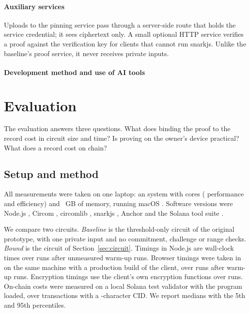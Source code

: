 \paragraph{Auxiliary services} Uploads to the pinning service pass through
a server-side route that holds the service credential; it sees ciphertext
only. A small optional HTTP service verifies a proof against the
verification key for clients that cannot run snarkjs. Unlike the baseline's
proof service, it never receives private inputs.

\ifspringerbuild
\paragraph{Development method and use of AI tools} \aistatement
\fi

\section{Evaluation}\label{sec:eval}

The evaluation answers three questions. What does binding the proof to the
record cost in circuit size and time? Is proving on the owner's device
practical? What does a record cost on chain?

\subsection{Setup and method}

All measurements were taken on one laptop: an \EnvCpu{} system with
\EnvCores{} cores (\EnvPerfCores{} performance and \EnvEffCores{}
efficiency) and \EnvMemGb~GB of memory, running macOS \EnvMacos. Software
versions were Node.js \EnvNode, Circom \EnvCircom, circomlib \EnvCircomlib,
snarkjs \EnvSnarkjs, Anchor \EnvAnchorLang{} and the Solana tool suite
\EnvSolana.

We compare two circuits. \emph{Baseline} is the threshold-only circuit of
the original prototype, with one private input and no commitment, challenge
or range checks. \emph{Bound} is the circuit of Section~\ref{sec:circuit}.
Timings in Node.js are wall-clock times over \NodeRuns{} runs after
\NodeWarmup{} unmeasured warm-up runs. Browser timings were taken in
\EnvBrowser{} on the same machine with a production build of the client,
over \BrowserRuns{} runs after \BrowserWarmup{} warm-up runs. Encryption
timings use the client's own encryption functions over \CryptoRuns{} runs.
On-chain costs were measured on a local Solana test validator with the
program loaded, over \ChainRuns{} transactions with a \CidChars-character
CID. We report medians with the 5th and 95th percentiles.

